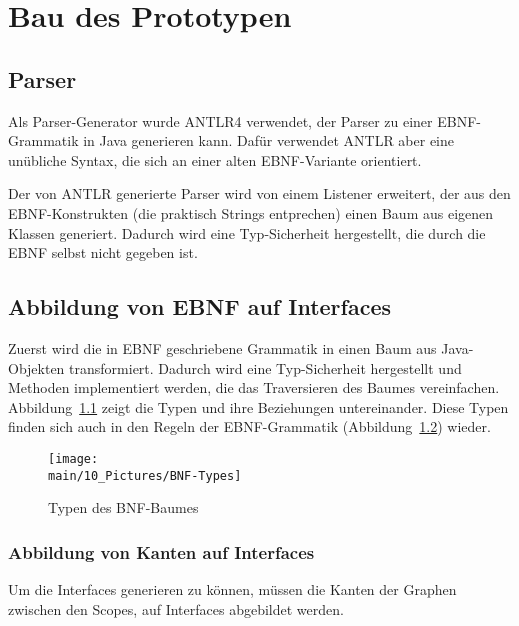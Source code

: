 \documentclass[../InterneDSLs.tex]{subfiles}
\begin{document}
\chapter{Bau des Prototypen}

\section{Parser}
Als Parser-Generator wurde ANTLR4 verwendet, der Parser zu einer EBNF-Grammatik in Java generieren kann. Dafür verwendet ANTLR aber eine unübliche Syntax, die sich an einer alten EBNF-Variante orientiert.

Der von ANTLR generierte Parser wird von einem Listener erweitert, der aus den EBNF-Konstrukten (die praktisch Strings entprechen) einen Baum aus eigenen Klassen generiert. Dadurch wird eine Typ-Sicherheit hergestellt, die durch die EBNF selbst nicht gegeben ist.

\section{Abbildung von EBNF auf Interfaces}
Zuerst wird die in EBNF geschriebene Grammatik in einen Baum aus Java-Objekten transformiert. Dadurch wird eine Typ-Sicherheit hergestellt und Methoden implementiert werden, die das Traversieren des Baumes vereinfachen. Abbildung~\ref{FIG:TypesBNF} zeigt die Typen und ihre Beziehungen untereinander. Diese Typen finden sich auch in den Regeln der EBNF-Grammatik (Abbildung~\ref{FIG:EBNFGrammar}) wieder.

\begin{figure}[ht]
\centering
\texttt{[image: \\main/10\_Pictures/BNF-Types]}
\caption{Typen des BNF-Baumes}
\label{FIG:TypesBNF}
\end{figure}

\begin{figure}[ht]

\label{FIG:EBNFGrammar}
\end{figure}

\subsection{Abbildung von Kanten auf Interfaces}
Um die Interfaces generieren zu können, müssen die Kanten der Graphen zwischen den Scopes, auf Interfaces abgebildet werden.
\end{document}
